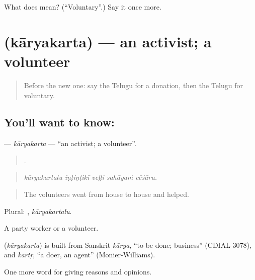 \begin{tcolorbox}[breakable,colback=teal!4,colframe=teal!35!black,title={Before you move on}]
What does  mean? (\textquotedblleft{}Voluntary\textquotedblright{}.) Say it once more.
\end{tcolorbox}
\section[\texorpdfstring{\te{కార్యకర్త} (kāryakarta)}{కార్యకర్త (kāryakarta)}]{ (kāryakarta) — an activist; a volunteer}

\label{lesson:TE-C410-karyakarta}



\begin{quote}
Before the new one: say the Telugu for a donation, then the Telugu for voluntary.
\end{quote}

\subsection*{You'll want to know: }
\textbf{} — \emph{kāryakarta} — \textquotedblleft{}an activist; a volunteer\textquotedblright{}.

\begin{quote}
    .
\end{quote}

\begin{quote}
\emph{kāryakartalu iṇṭiṇṭikī veḷḷi sahāyaṁ cēśāru.}
\end{quote}

\begin{quote}
The volunteers went from house to house and helped.
\end{quote}

Plural: , \emph{kāryakartalu}.

A party worker or a volunteer.

\begin{cousinweb}
\textbf{} (\emph{kāryakarta}) is built from Sanskrit \emph{kārya}, \textquotedblleft{}to be done; business\textquotedblright{} (CDIAL 3078), and \emph{kartṛ}, \textquotedblleft{}a doer, an agent\textquotedblright{} (Monier-Williams).
\end{cousinweb}

\begin{grammarlens}[title={What you've built}]
One more word for giving reasons and opinions.
\end{grammarlens}

